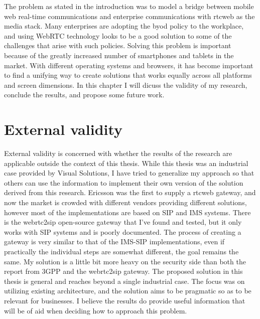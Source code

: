

The problem as stated in the introduction was to model a bridge between mobile web real-time communications and enterprise communications with \gls{rtcweb} as the media stack. Many enterprises are adopting the \gls{byod} policy to the workplace, and using WebRTC technology looks to be a good solution to some of the challenges that arise with such policies. Solving this problem is important because of the greatly increased number of smartphones and tablets in the market. With different operating systems and browsers, it has become important to find a unifying way to create solutions that works equally across all platforms and screen dimensions. In this chapter I will dicuss the validity of my research, conclude the results, and propose some future work.


\section{External validity}
External validity is concerned with whether the results of the research are applicable outside the context of this thesis. While this thesis was an industrial case provided by Visual Solutions, I have tried to generalize my approach so that others can use the information to implement their own version of the solution derived from this research. Ericsson was the first to supply a \gls{rtcweb} gateway, and now the market is crowded with different vendors providing different solutions, however most of the implementations are based on SIP and IMS systems. There is the webrtc2sip open-source gateway that I've found and tested, but it only works with SIP systems and is poorly documented. The process of creating a gateway is very similar to that of the IMS-SIP implementations, even if practically the individual steps are somewhat different, the goal remains the same. My solution is a little bit more heavy on the security side than both the report from 3GPP\cite{3gpp-wrtc-access-ims} and the webrtc2sip gateway. The proposed solution in this thesis is general and reaches beyond a single industrial case. The focus was on utilizing existing architecture, and the solution aims to be pragmatic so as to be relevant for businesses. I believe the results do provide useful information that will be of aid when deciding how to approach this problem.

